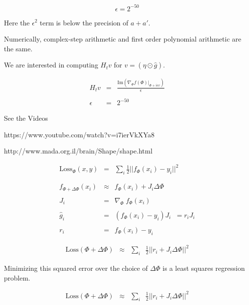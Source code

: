 {\vfill
$$\epsilon = 2^{-50}$$

\vfill
Here the $\epsilon^2$ term is below the precision of $a + a'$.

\vfill
Numerically, complex-step arithmetic and first order polynomial arithmetic are the same.



We are interested in computing $H_t v$ for $v = (\eta \odot \hat{g})$.

\vfill
\begin{eqnarray*}
  H_t v & = & \frac{\mathrm{Im}(\nabla_\Phi f(\Phi)|_{\Phi + i\epsilon v})}{\epsilon} \\
  \\
  \epsilon & = & 2^{-50}
\end{eqnarray*}



\centerline{See the Videos}

https://www.youtube.com/watch?v=i7ierVkXYa8

http://www.mada.org.il/brain/Shape/shape.html


\begin{eqnarray*}
  \mathrm{Loss}_\Phi(x,y) & = & \sum_i \frac{1}{2}||f_\Phi(x_i) - y_i||^2 \\
  \\
  \\
  f_{\Phi + \Delta \Phi}(x_i) & \approx & f_\Phi(x_i) + J_i\Delta \Phi \\
  \\
  J_i & = & \nabla_\Phi \;f_\Phi(x_i) \\
  \\
  \hat{g}_i & = & (f_\Phi(x_i) - y_i) J_i \;\;= r_iJ_i \\
  \\
  r_i & = & f_\Phi(x_i) - y_i 
\end{eqnarray*}


\begin{eqnarray*}
    \mathrm{Loss}(\Phi + \Delta \Phi) & \approx & \sum_i\;\;\frac{1}{2}||r_i + J_i\Delta\Phi||^2
\end{eqnarray*}

\vfill
Minimizing this squared error over the choice of $\Delta \Phi$ is a least squares regression problem.

\begin{eqnarray*}
    \mathrm{Loss}(\Phi + \Delta \Phi) & \approx & \sum_i\;\;\frac{1}{2}||r_i + J_i\Delta\Phi||^2
\end{eqnarray*}

}
